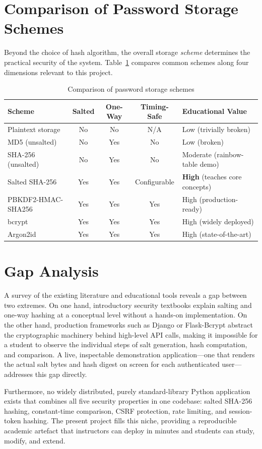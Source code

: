 \section{Comparison of Password Storage Schemes}
\label{sec:lit_schemes}

Beyond the choice of hash algorithm, the overall storage \emph{scheme} determines the practical security of the system. Table~\ref{tab:scheme_comparison} compares common schemes along four dimensions relevant to this project.

\begin{table}[H]
\centering
\caption{Comparison of password storage schemes}
\label{tab:scheme_comparison}
\begin{tabularx}{\textwidth}{|l|c|c|c|X|}
\hline
\textbf{Scheme} & \textbf{Salted} & \textbf{One-Way} & \textbf{Timing-Safe} & \textbf{Educational Value} \\\hline
Plaintext storage      & No  & No  & N/A & Low (trivially broken) \\\hline
MD5 (unsalted)         & No  & Yes & No  & Low (broken) \\\hline
SHA-256 (unsalted)     & No  & Yes & No  & Moderate (rainbow-table demo) \\\hline
Salted SHA-256         & Yes & Yes & Configurable & \textbf{High} (teaches core concepts) \\\hline
PBKDF2-HMAC-SHA256     & Yes & Yes & Yes & High (production-ready) \\\hline
bcrypt                 & Yes & Yes & Yes & High (widely deployed) \\\hline
Argon2id               & Yes & Yes & Yes & High (state-of-the-art) \\\hline
\end{tabularx}
\end{table}

\section{Gap Analysis}
\label{sec:lit_gap}

A survey of the existing literature and educational tools reveals a gap between two extremes. On one hand, introductory security textbooks explain salting and one-way hashing at a conceptual level without a hands-on implementation. On the other hand, production frameworks such as Django or Flask-Bcrypt abstract the cryptographic machinery behind high-level API calls, making it impossible for a student to observe the individual steps of salt generation, hash computation, and comparison. A live, inspectable demonstration application---one that renders the actual salt bytes and hash digest on screen for each authenticated user---addresses this gap directly.

Furthermore, no widely distributed, purely standard-library Python application exists that combines all five security properties in one codebase: salted SHA-256 hashing, constant-time comparison, CSRF protection, rate limiting, and session-token hashing. The present project fills this niche, providing a reproducible academic artefact that instructors can deploy in minutes and students can study, modify, and extend.
